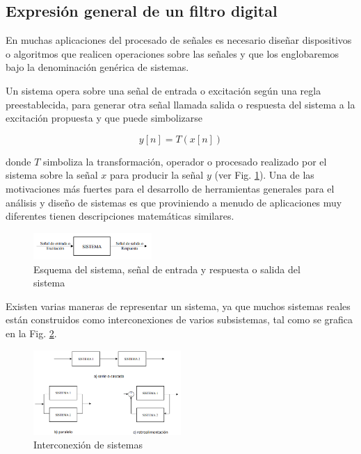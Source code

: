\subsection{Expresión general de un filtro digital}
    En muchas aplicaciones del procesado de señales es necesario diseñar dispositivos o algoritmos que realicen operaciones sobre las señales y que los englobaremos bajo la denominación genérica de sistemas.

    Un sistema opera sobre una señal de entrada o excitación según una regla preestablecida, para generar otra señal llamada salida o respuesta del sistema a la  excitación propuesta y que puede simbolizarse

    \begin{equation}
      y[n] = T(x[n])
    \end{equation}

    donde $T$ simboliza la transformación, operador o procesado realizado por el sistema sobre la señal $x$ para producir la señal $y$ (ver Fig. \ref{fig:esquemaFiltro}). Una de las motivaciones más fuertes para el desarrollo de herramientas generales para el análisis y diseño de sistemas es que proviniendo a menudo de aplicaciones muy diferentes tienen descripciones matemáticas similares.

    \begin{figure}
      \centering
      \includegraphics[width=0.4\textwidth]{../images/esquemaFiltro.png}
      \caption{Esquema del sistema, señal de entrada y respuesta o salida del sistema}
      \label{fig:esquemaFiltro}
    \end{figure}

    Existen varias maneras de representar un sistema, ya que muchos sistemas reales están construidos como interconexiones de varios subsistemas, tal como se grafica en la Fig. \ref{fig:interconexionSistema}.

    \begin{figure}
      \centering
      \includegraphics[width=0.5\textwidth]{../images/interconexionSistema.png}
      \caption{Interconexión de sistemas}
      \label{fig:interconexionSistema}
    \end{figure}

